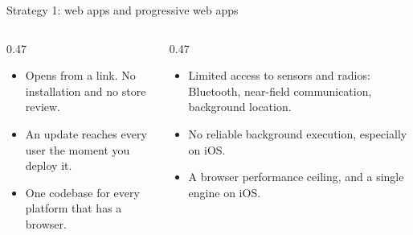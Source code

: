 \documentclass[10pt,aspectratio=169,t]{beamer}
\begin{document}
\begin{frame}[eyebrow=Strategies]{Strategy 1: web apps and progressive web apps}
  \vskip 2mm
  \begin{columns}[T]
    \begin{column}{0.47\textwidth}
      \begin{itemize}
        \item Opens from a link. No installation and no store review.
        \item An update reaches every user the moment you deploy it.
        \item One codebase for every platform that has a browser.
      \end{itemize}
    \end{column}
    \begin{column}{0.47\textwidth}
      \begin{itemize}
        \item Limited access to sensors and radios: Bluetooth, near-field communication, background location.
        \item No reliable background execution, especially on iOS.
        \item A browser performance ceiling, and a single engine on iOS.
      \end{itemize}
    \end{column}
  \end{columns}
  \vskip 2mm
\end{frame}
\end{document}
